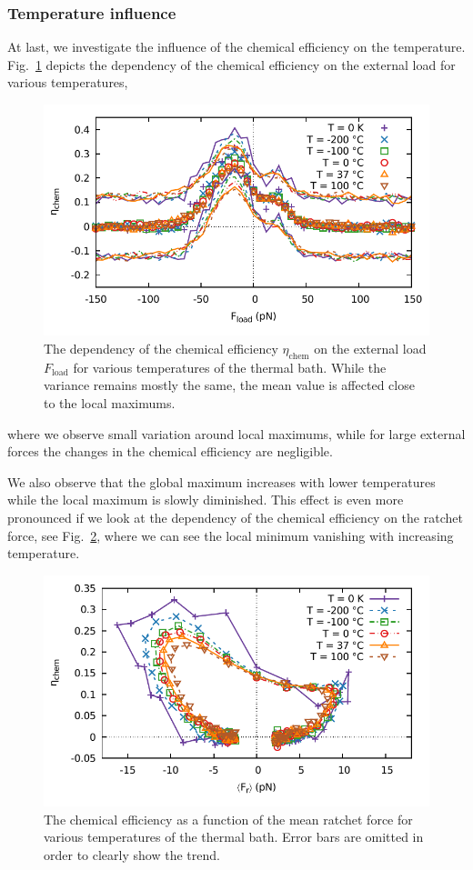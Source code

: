 \documentclass[aps,pre,twocolumn,showpacs,showkeys,superscriptaddress,floatfix]{revtex4-1}
\begin{document}
\subsubsection{Temperature influence}
At last, we investigate the influence of the chemical efficiency on the temperature. 
Fig.~\ref{fig:F_q_temp} depicts the dependency of the chemical efficiency on the external load for various temperatures,
\begin{figure}[t]
\centering
\includegraphics[width=.9\linewidth,height=!]{F_q_temp}
\caption{
\label{fig:F_q_temp}
The dependency of the chemical efficiency $\eta_\text{chem}$ on the external load $F_\text{load}$ for various temperatures of the thermal bath. 
While the variance remains mostly the same, the mean value is affected close to the local maximums. 
}
\end{figure}
where we observe small variation around local maximums,
while for large external forces the changes in the chemical efficiency are negligible. 

We also observe that the global maximum increases with lower temperatures while the local maximum is slowly diminished.
This effect is even more pronounced if we look at the dependency of the chemical efficiency on the ratchet force, see Fig.~\ref{fig:T_eta},
where we can see the local minimum vanishing with increasing temperature. 
\begin{figure}[t]
\centering
\includegraphics[width=.9\linewidth,height=!]{T_eta}
\caption{
\label{fig:T_eta}
The chemical efficiency as a function of the mean ratchet force for various temperatures of the thermal bath. 
Error bars are omitted in order to clearly show the trend. 
}
\end{figure}
\end{document}
